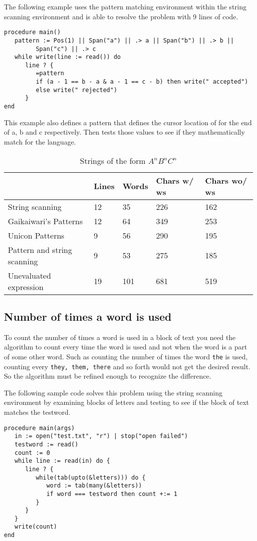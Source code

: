 \documentclass{article}
\begin{document}
The following example uses the pattern matching environment within the string scanning environment and is able to resolve the problem with 9 lines of code.
\begin{verbatim}
procedure main()
   pattern := Pos(1) || Span("a") || .> a || Span("b") || .> b ||
         Span("c") || .> c 
   while write(line := read()) do
      line ? {
         =pattern
         if (a - 1 == b - a & a - 1 == c - b) then write(" accepted")
         else write(" rejected")
      }
end
\end{verbatim}
This example also defines a pattern that defines the cursor location of for the end of a, b and c respectively.  Then tests those values to see if they mathematically match for the language.

\begin{table}[ht]
	\caption{Strings of the form \emph{$A^nB^nC^n$}}
	\centering
	\begin{tabular}{|l|l|l|l|l|}
		\hline\hline
		 & Lines & Words & Chars w/ ws & Chars wo/ ws\\
		\hline
		String scanning & 12 & 35 & 226 & 162 \\
		Gaikaiwari's Patterns & 12 & 64 & 349 & 253 \\
		Unicon Patterns & 9 & 56 & 290 & 195 \\
		Pattern and string scanning & 9 & 53 & 275 & 185 \\
		Unevaluated expression & 19 & 101 & 681 & 519 \\
		\hline
	\end{tabular}
\end{table}

\subsection{Number of times a word is used}
To count the number of times a word is used in a block of text you need the algorithm to count every time the word is used and not when the word is a part of some other word.  Such as counting the number of times the word \texttt{the} is used, counting every \texttt{they, them, there} and so forth would not get the desired result.  So the algorithm must be refined enough to recognize the difference.

The following sample code solves this problem using the string scanning environment by examining blocks of letters and testing to see if the block of text matches the testword.
\begin{verbatim}
procedure main(args)
   in := open("test.txt", "r") | stop("open failed")
   testword := read()
   count := 0
   while line := read(in) do {
      line ? {
         while(tab(upto(&letters))) do {
            word := tab(many(&letters))
            if word === testword then count +:= 1
         }
      }
   }
   write(count)
end
\end{verbatim}
\end{document}
